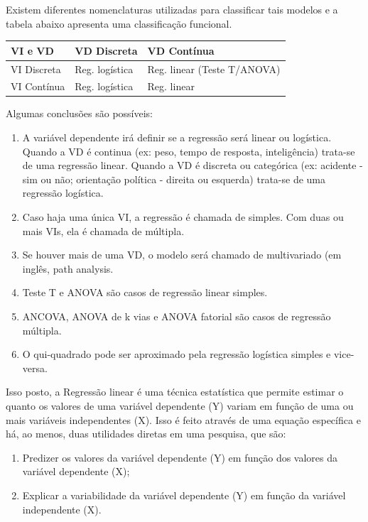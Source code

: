 \documentclass[
]{book}
\providecommand{\tightlist}{%
  \setlength{\itemsep}{0pt}\setlength{\parskip}{0pt}}
\begin{document}
Existem diferentes nomenclaturas utilizadas para classificar tais modelos e a tabela abaixo apresenta uma classificação funcional.

\begin{longtable}[]{@{}lll@{}}
\toprule
VI e VD & VD Discreta & VD Contínua\tabularnewline
\midrule
\endhead
VI Discreta & Reg. logística & Reg. linear (Teste T/ANOVA)\tabularnewline
VI Contínua & Reg. logística & Reg. linear\tabularnewline
\bottomrule
\end{longtable}

Algumas conclusões são possíveis:

\begin{enumerate}
\def\labelenumi{\arabic{enumi}.}
\tightlist
\item
  A variável dependente irá definir se a regressão será linear ou logística. Quando a VD é continua (ex: peso, tempo de resposta, inteligência) trata-se de uma regressão linear. Quando a VD é discreta ou categórica (ex: acidente - sim ou não; orientação política - direita ou esquerda) trata-se de uma regressão logística.\\
\item
  Caso haja uma única VI, a regressão é chamada de simples. Com duas ou mais VIs, ela é chamada de múltipla.\\
\item
  Se houver mais de uma VD, o modelo será chamado de multivariado (em inglês, path analysis.\\
\item
  Teste T e ANOVA são casos de regressão linear simples.\\
\item
  ANCOVA, ANOVA de k vias e ANOVA fatorial são casos de regressão múltipla.\\
\item
  O qui-quadrado pode ser aproximado pela regressão logística simples e vice-versa.
\end{enumerate}

Isso posto, a Regressão linear é uma técnica estatística que permite estimar o quanto os valores de uma variável dependente (Y) variam em função de uma ou mais variáveis independentes (X). Isso é feito através de uma equação específica e há, ao menos, duas utilidades diretas em uma pesquisa, que são:

\begin{enumerate}
\def\labelenumi{(\roman{enumi})}
\tightlist
\item
  Predizer os valores da variável dependente (Y) em função dos valores da variável dependente (X);\\
\item
  Explicar a variabilidade da variável dependente (Y) em função da variável independente (X).
\end{enumerate}
\end{document}
